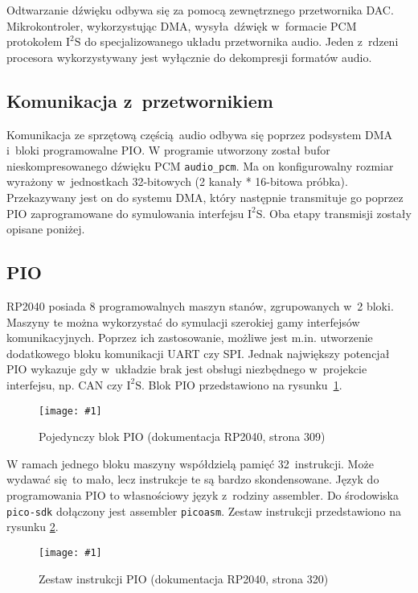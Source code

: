 \documentclass[polish]{aghengthesis}
\newcommand{\imgint}[4]{
	\begin{figure}[{#4}]
		\centering
		\texttt{[image: \#1]}
		\caption{#2}
		\label{#1}
	\end{figure}
}
\newcommand{\imgh}[3]{\imgint{#1}{#2}{#3}{H}}
\newcommand{\isqs}{$\text{I}^{2}\text{S}$}
\begin{document}
		
			
		Odtwarzanie dźwięku odbywa się za pomocą zewnętrznego przetwornika DAC. Mikrokontroler, wykorzystując DMA, wysyła dźwięk w~formacie PCM protokołem \isqs{} do specjalizowanego układu przetwornika audio. Jeden z~rdzeni procesora wykorzystywany jest wyłącznie do dekompresji formatów audio.
		
		
		\subsection{Komunikacja z~przetwornikiem}
			Komunikacja ze sprzętową częścią audio odbywa się poprzez podsystem DMA i~bloki programowalne PIO.
			W programie utworzony został bufor nieskompresowanego dźwięku PCM \lstinline|audio_pcm|. Ma on konfigurowalny rozmiar wyrażony w~jednostkach 32-bitowych (2 kanały * 16-bitowa próbka). Przekazywany jest on do systemu DMA, który następnie transmituje go poprzez PIO zaprogramowane do symulowania interfejsu \isqs{}. Oba etapy transmisji zostały opisane poniżej.
		
		\subsection{PIO}
			RP2040 posiada 8 programowalnych maszyn stanów, zgrupowanych w~2 bloki.
			Maszyny te można wykorzystać do symulacji szerokiej gamy interfejsów komunikacyjnych.
			Poprzez ich zastosowanie, możliwe jest m.in. utworzenie dodatkowego bloku komunikacji UART czy SPI.
			Jednak największy potencjał PIO wykazuje gdy w~układzie brak jest obsługi niezbędnego w~projekcie interfejsu, np. CAN czy \isqs{}.
			Blok PIO przedstawiono na rysunku~\ref{3/pio_block}.
			\imgh{3/pio_block}{Pojedynczy blok PIO (dokumentacja RP2040\textsuperscript{\cite{pico_pdf}}, strona 309)}{0.75}
			
			W ramach jednego bloku maszyny współdzielą pamięć 32 instrukcji. Może wydawać się to mało, lecz instrukcje te są bardzo skondensowane. Język do programowania PIO to własnościowy język z~rodziny assembler. Do środowiska \lstinline|pico-sdk| dołączony jest assembler \lstinline|picoasm|. Zestaw instrukcji przedstawiono na rysunku \ref{3/pio_instr}.
			\imgh{3/pio_instr}{Zestaw instrukcji PIO (dokumentacja RP2040, strona 320)}{0.7}
			
\end{document}
